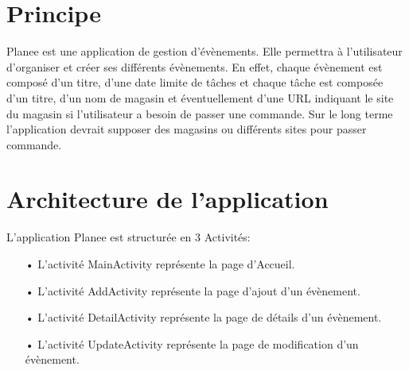 \documentclass[12pt,a4paper]{report}
\begin{document}
\section{Principe}
\begin{flushleft}
\justify
Planee est une application de gestion d'évènements. Elle permettra à l'utilisateur d'organiser et créer ses différents évènements. En effet, chaque évènement est composé d'un titre, d'une date limite de tâches et chaque tâche est composée d'un titre, d'un nom de magasin et éventuellement d'une URL indiquant le site du magasin si l'utilisateur a besoin de passer une commande. Sur le long terme l'application devrait supposer des magasins ou différents sites pour passer commande.
\end{flushleft}
\section{Architecture de l'application}
\begin{flushleft}
\justify
L'application Planee est structurée en 3 Activités:
\begin{itemize}
\item[•] L'activité MainActivity représente la page d'Accueil.
\item[•] L'activité AddActivity représente la page d'ajout d'un évènement.
\item[•] L'activité DetailActivity représente la page de détails d'un évènement.
\item[•] L'activité UpdateActivity représente la page de modification d'un évènement.
\end{itemize}
\end{flushleft}
\end{document}
